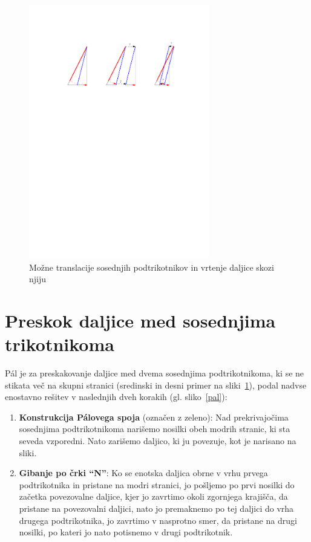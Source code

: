 \documentclass[a4paper, 12pt]{article}
\begin{document}
\begin{figure}[h!]
    \centering
    \includegraphics[width=0.7\textwidth]{ipe_slike/preskok1.pdf}
    \caption{Možne translacije sosednjih podtrikotnikov in vrtenje daljice skozi njiju}
    \label{preskok1}
\end{figure}


\section*{Preskok daljice med sosednjima trikotnikoma}

Pál je za preskakovanje daljice med dvema sosednjima podtrikotnikoma, ki se ne stikata več na skupni stranici (sredinski in desni primer na sliki~\ref{preskok1}), podal nadvse enostavno rešitev v naslednjih dveh korakih (gl. sliko~\ref{pal}):

\begin{enumerate}
    \item \textbf{Konstrukcija Pálovega spoja} (označen z zeleno): Nad prekrivajočima sosednjima podtrikotnikoma narišemo nosilki obeh modrih stranic, ki sta seveda vzporedni. Nato zarišemo daljico, ki ju povezuje, kot je narisano na sliki.
    \item \textbf{Gibanje po črki ``N''}: Ko se enotska daljica obrne v vrhu prvega podtrikotnika in pristane na modri stranici, jo pošljemo po prvi nosilki do začetka povezovalne daljice, kjer jo zavrtimo okoli zgornjega krajišča, da pristane na povezovalni daljici, nato jo premaknemo po tej daljici do vrha drugega podtrikotnika, jo zavrtimo v nasprotno smer, da pristane na drugi nosilki, po kateri jo nato potisnemo v drugi podtrikotnik.
\end{enumerate}
\end{document}
